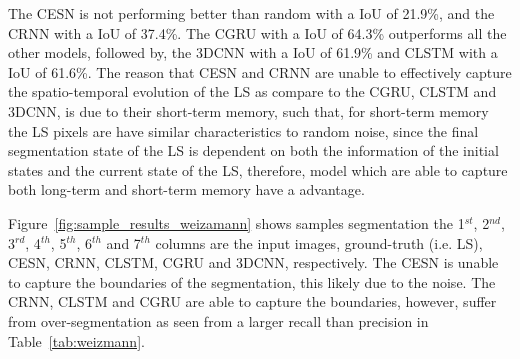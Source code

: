 \documentclass{WitsPhysicsReport}
\begin{document}
The CESN is not performing better than random with a IoU of 21.9\%, and the CRNN with a IoU of 37.4\%. The CGRU with a IoU of 64.3\% outperforms all the other models, followed by,  the 3DCNN with a IoU of 61.9\% and CLSTM with a IoU of 61.6\%. The reason that CESN and CRNN are unable to effectively capture the spatio-temporal evolution of the LS as compare to the CGRU, CLSTM and 3DCNN, is due to their short-term memory, such that, for short-term memory the LS pixels are have similar characteristics to random noise, since the final segmentation state of the LS is dependent on both the information of the initial states and the current state of the LS, therefore, model which are able to capture both long-term and short-term memory have a advantage. 

\begin{table}[H]
\centering
 \caption{WSD testing set results. Here we compare various models and noise is also included.}
    \label{tab:weizmann}
\end{table}


Figure~\ref{fig:sample_results_weizamann} shows samples segmentation the 1$^{st}$, 2$^{nd}$, 3$^{rd}$, 4$^{th}$, 5$^{th}$, 6$^{th}$ and 7$^{th}$ columns are the input images, ground-truth (i.e. LS), CESN, CRNN, CLSTM, CGRU and 3DCNN, respectively. The CESN is unable to capture the boundaries of the segmentation, this likely due to the noise. The CRNN, CLSTM and CGRU are able to capture the boundaries, however, suffer from over-segmentation as seen from a larger recall than precision in Table~\ref{tab:weizmann}.
\end{document}
